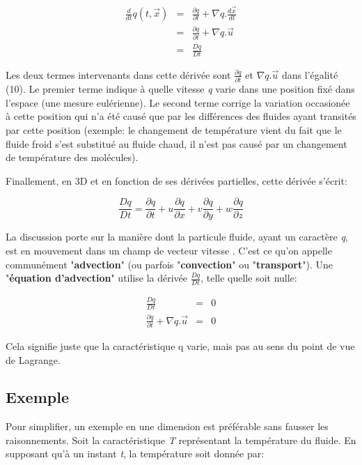 \documentclass[11pt]{report}
\begin{document}
\begin{eqnarray}
\frac{d}{dt} q(t, \overrightarrow{x}) 
& = & \frac{\partial q}{\partial t} + \nabla q. \frac{d\overrightarrow{x}}{dt} \\
& = & \frac{\partial q}{\partial t} + \nabla q. \overrightarrow{u} \\
& = & \frac{Dq}{Dt}
\end{eqnarray}

Les deux termes intervenants dans cette dérivée sont $ \frac{\partial q}{\partial t} $ et  $ \nabla q. \overrightarrow{u} $ dans l'égalité (10). Le premier terme indique à quelle vitesse \textit{q} varie dans une position fixé dans l'espace (une mesure eulérienne). Le second terme corrige la variation occasionée à cette position qui n'a été causé que par les différences des fluides ayant transités par cette position (exemple: le changement de température vient du fait que le fluide froid s'est substitué au fluide chaud, il n'est pas causé par un changement de température des molécules).

Finallement, en 3D et en fonction de ses dérivées partielles, cette dérivée s'écrit:

\begin{equation}
\frac{Dq}{Dt} 
 =  \frac{\partial q}{\partial t} + u \frac{\partial q}{\partial x} + v \frac{\partial q}{\partial y} + w \frac{\partial q}{\partial z}
\end{equation}
 
La discussion porte sur la manière dont la particule fluide, ayant un caractère \textit{q}, est en mouvement dans un champ de vecteur vitesse . C'est ce qu'on appelle communément "\textbf{advection}" (ou parfois "\textbf{convection}" ou "\textbf{transport}"). Une "\textbf{équation d'advection}" utilise la dérivée $ \frac{Dq}{Dt} $, telle quelle soit nulle:

\begin{eqnarray}
\frac{Dq}{Dt} & = & 0 \\
\frac{\partial q}{\partial t} + \nabla q. \overrightarrow{u} & = & 0
\end{eqnarray}

Cela signifie juste que la caractéristique q varie, mais pas au sens du point de vue de Lagrange.

\subsection{Exemple}

Pour simplifier, un exemple en une dimension est préférable sans fausser les raisonnements. Soit la caractéristique \textit{T} représentant la température du fluide. En supposant qu'à un instant \textit{t}, la température soit donnée par: 
\end{document}
